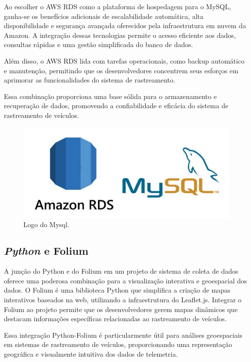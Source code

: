      Ao escolher o AWS RDS como a plataforma de hospedagem para o MySQL, ganha-se os benefícios adicionais de escalabilidade automática, alta disponibilidade e segurança avançada oferecidos pela infraestrutura em nuvem da Amazon. A integração dessas tecnologias permite o acesso eficiente aos dados, consultas rápidas e uma gestão simplificada do banco de dados. 
     
     Além disso, o AWS RDS lida com tarefas operacionais, como backup automático e manutenção, permitindo que os desenvolvedores concentrem seus esforços em aprimorar as funcionalidades do sistema de rastreamento. 
     
     Essa combinação proporciona uma base sólida para o armazenamento e recuperação de dados, promovendo a confiabilidade e eficácia do sistema de rastreamento de veículos.

      \begin{figure}[hp]
    \centering
    
    \includegraphics[scale=0.4]{figures/logo_Mysql.jpg}
    
    \caption{Logo do Mysql.}
    
\end{figure}

    
     \subsection{\textit{Python} e Folium} A junção do Python e do Folium em um projeto de sistema de coleta de dados oferece uma poderosa combinação para a visualização interativa e geoespacial dos dados. O Folium é uma biblioteca Python que simplifica a criação de mapas interativos baseados na web, utilizando a infraestrutura do Leaflet.js. Integrar o Folium ao projeto permite que os desenvolvedores gerem mapas dinâmicos que destacam informações específicas relacionadas ao rastreamento de veículos.

    Essa integração Python-Folium é particularmente útil para análises geoespaciais em sistemas de rastreamento de veículos, proporcionando uma representação geográfica e visualmente intuitiva dos dados de telemetria. 
    
